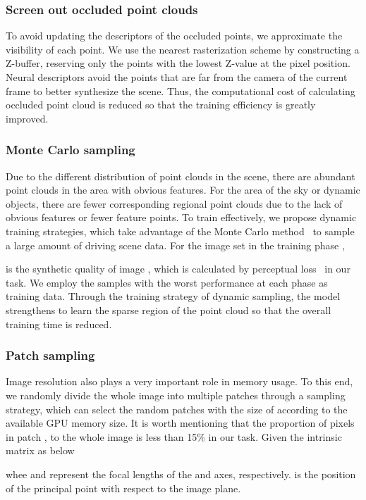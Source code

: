 \documentclass[sigconf]{acmart}
\begin{document}
\subsubsection{Screen out occluded point clouds}
To avoid updating the descriptors of the occluded points, we approximate the visibility of each point. We use the nearest rasterization scheme by constructing a Z-buffer, reserving only the points with the lowest Z-value at the pixel position. Neural descriptors avoid the points that are far from the camera of the current frame to better synthesize the scene. Thus, the computational cost of calculating occluded point cloud is reduced so that the training efficiency is greatly improved.

\subsubsection{Monte Carlo sampling}

Due to the different distribution of point clouds in the scene, there are abundant point clouds in the area with obvious features. For the area of the sky or dynamic objects, there are fewer corresponding regional point clouds due to the lack of obvious features or fewer feature points. To train effectively, we propose dynamic training strategies, which take advantage of the Monte Carlo method~\cite{shapiro2003monte} to sample a large amount of driving scene data. For the image set  in the training phase ,

 is the synthetic quality of image , which is calculated by perceptual loss~\cite{johnson2016perceptual} in our task. We employ the  samples with the worst performance at each phase as training data. Through the training strategy of dynamic sampling, the model strengthens to learn the sparse region of the point cloud so that the overall training time is reduced.
  
\subsubsection{Patch sampling} 
Image resolution also plays a very important role in memory usage. To this end, we randomly divide the whole image into multiple patches through a sampling strategy, which can select the random patches with the size of  according to the available GPU memory size. It is worth mentioning that the proportion of pixels in patch , to the whole image  is less than 15\% in our task. Given the intrinsic matrix  as below  

whee  and  represent the focal lengths of the  and  axes, respectively.  is the position of the principal point with respect to the image plane. 
\end{document}
